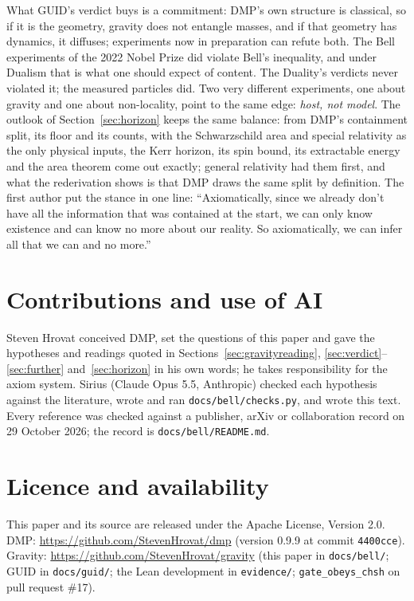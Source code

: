 \documentclass[11pt,a4paper]{article}
\theoremstyle{definition}
\theoremstyle{remark}
\newcommand{\lean}[1]{\texttt{#1}}
\begin{document}
What GUID's verdict buys is a commitment: DMP's own structure is classical, so if it is the geometry, gravity does not entangle masses,
and if that geometry has dynamics, it diffuses; experiments now in preparation can refute both. The Bell experiments of the 2022 Nobel
Prize did violate Bell's inequality, and under Dualism that is what one should expect of content. The Duality's verdicts never violated it;
the measured particles did. Two very different experiments, one about gravity and one about non-locality, point to the same edge:
\emph{host, not model}. The outlook of Section~\ref{sec:horizon} keeps the same balance: from DMP's containment split, its floor and its counts,
with the Schwarzschild area and special relativity as the only physical inputs, the Kerr horizon, its spin bound, its extractable energy
and the area theorem come out exactly; general relativity had them first, and what the rederivation shows is that DMP draws the same split
by definition. The first author put the stance in one line: ``Axiomatically, since we already don't have all the information
that was contained at the start, we can only know existence and can know no more about our reality. So axiomatically, we can infer all
that we can and no more.''

\section*{Contributions and use of AI}
Steven Hrovat conceived DMP, set the questions of this paper and gave the hypotheses and readings quoted in Sections~\ref{sec:gravityreading}, \ref{sec:verdict}--\ref{sec:further}
and~\ref{sec:horizon} in his own words; he takes responsibility for the axiom system. Sirius (Claude Opus 5.5, Anthropic) checked each hypothesis against the
literature, wrote and ran \texttt{docs/bell/checks.py}, and wrote this text. Every reference was checked against a publisher, arXiv or
collaboration record on 29 October 2026; the record is \texttt{docs/bell/README.md}.

\section*{Licence and availability}
This paper and its source are released under the Apache License, Version 2.0. DMP: \url{https://github.com/StevenHrovat/dmp} (version 0.9.9
at commit \texttt{4400cce}). Gravity: \url{https://github.com/StevenHrovat/gravity} (this paper in \texttt{docs/bell/}; GUID in
\texttt{docs/guid/}; the Lean development in \texttt{evidence/}; \lean{gate\_obeys\_chsh} on pull request \#17).
\end{document}
